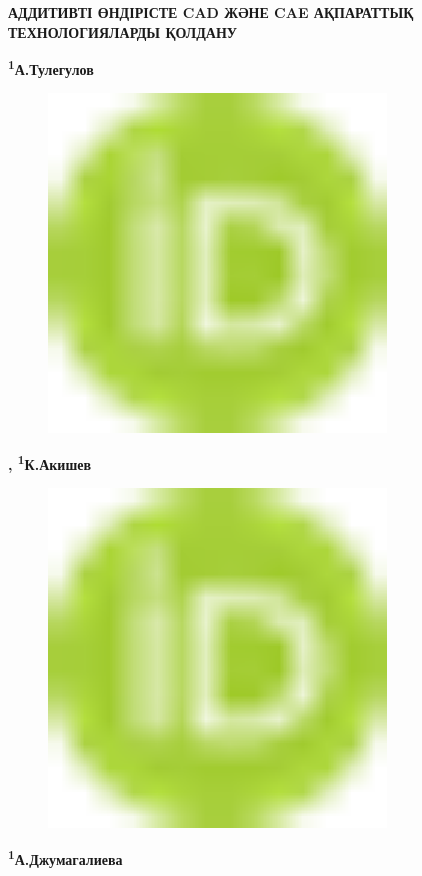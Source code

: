 
{\bfseries АДДИТИВТІ ӨНДІРІСТЕ CAD ЖӘНЕ CAE АҚПАРАТТЫҚ ТЕХНОЛОГИЯЛАРДЫ
ҚОЛДАНУ}

{\bfseries \textsuperscript{1}А.Тулегулов}
\begin{figure}[H]
	\centering
	\includegraphics[width=0.8\textwidth]{media/ict2/image1}
	\caption*{}
\end{figure}
{\bfseries \textsuperscript{\envelope },
\textsuperscript{1}К.Акишев}

\begin{figure}[H]
	\centering
	\includegraphics[width=0.8\textwidth]{media/ict2/image1}
	\caption*{}
\end{figure}
{\bfseries \textsuperscript{1}А.Джумагалиева}

